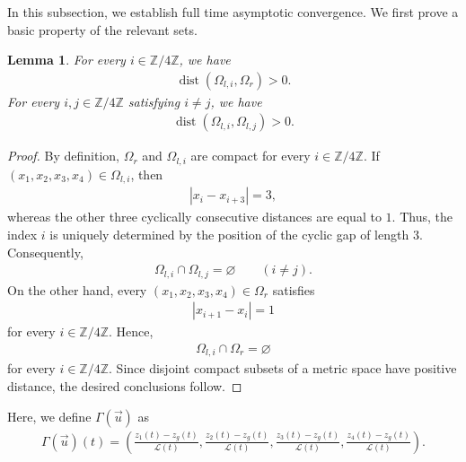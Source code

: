 \documentclass[reqno]{amsart}
\theoremstyle{plain}
\newtheorem{lemma}[theorem]{Lemma}
\theoremstyle{definition}
\numberwithin{equation}{section}
\begin{document}
In this subsection, we establish full time asymptotic convergence. We first prove a basic property of the relevant sets.
\begin{lemma}\label{setlemma}
For every $i\in\mathbb{Z}/4\mathbb{Z}$, we have
\begin{align*}
\operatorname{dist}\left(\Omega_{l,i},\Omega_r\right)>0.
\end{align*}
For every $i,j\in\mathbb{Z}/4\mathbb{Z}$ satisfying $i\neq j$, we have
\begin{align*}
\operatorname{dist}\left(\Omega_{l,i},\Omega_{l,j}\right)>0.
\end{align*}
\end{lemma}
\begin{proof}
By definition, $\Omega_r$ and $\Omega_{l,i}$ are compact for every $i\in\mathbb{Z}/4\mathbb{Z}$. If $(x_1,x_2,x_3,x_4)\in\Omega_{l,i}$, then
\begin{align*}
|x_i-x_{i+3}|=3,
\end{align*}
whereas the other three cyclically consecutive distances are equal to $1$. Thus, the index $i$ is uniquely determined by the position of the cyclic gap of length $3$. Consequently,
\begin{align*}
\Omega_{l,i}\cap\Omega_{l,j}=\varnothing
\qquad (i\neq j).
\end{align*}
On the other hand, every $(x_1,x_2,x_3,x_4)\in\Omega_r$ satisfies
\begin{align*}
|x_{i+1}-x_i|=1
\end{align*}
for every $i\in\mathbb{Z}/4\mathbb{Z}$. Hence,
\begin{align*}
\Omega_{l,i}\cap\Omega_r=\varnothing
\end{align*}
for every $i\in\mathbb{Z}/4\mathbb{Z}$. Since disjoint compact subsets of a metric space have positive distance, the desired conclusions follow.
\end{proof}

Here, we define $\Gamma(\vec{u})$ as 
\begin{align}\label{Gammaudef}
\Gamma(\vec{u})(t)=\left(\frac{z_1(t)-z_g(t)}{\mathcal{L}(t)},\frac{z_2(t)-z_g(t)}{\mathcal{L}(t)},\frac{z_3(t)-z_g(t)}{\mathcal{L}(t)},\frac{z_4(t)-z_g(t)}{\mathcal{L}(t)}\right).
\end{align}
\end{document}
